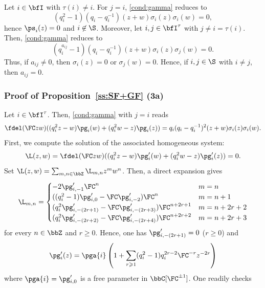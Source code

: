 \documentclass[reqno]{amsart}
\numberwithin{equation}{section}
\begin{document}
Let $i\in\bfI$ with $\tau(i)\neq i$. For $j=i$, \eqref{cond:gamma} reduces to 
\[
(q_i^{2}-1)(q_i-q_i^{-1})(z+w)\sigma_i(z)\sigma_i(w)=0,
\]
hence $\ps_i(z)=0$ and $i\not\in\S$. Moreover, let $i,j\in\bfI^\tau$ with $j\neq i=\tau(i)$. Then,
\eqref{cond:gamma} reduces to 
\[
(q_i^{a_{ij}}-1)(q_i-q_i^{-1})(z+w)\sigma_i(z)\sigma_j(w)=0.
\]
Thus, if $a_{ij}\neq 0$, then $\sigma_i(z)=0$ or $\sigma_j(w)=0$. Hence, if $i,j\in\S$ with $i\neq j$, then $a_{ij}=0$.

\subsubsection{Proof of Proposition~\ref{ss:SF+GF} (3a)}\label{sss:pf-parameter-3a}
Let $i\in\bfI^\tau$. Then, \eqref{cond:gamma} with $j=i$ reads
\begin{equation}
	\begin{aligned}
		\fdel(\FC zw)
		((q_i^{2}z-w)\pg_{i}(w)
		+(q_i^{2}w-z)\pg_i(z))=q_i(q_i-q_i^{-1})^2(z+w)\sigma_i(z)\sigma_i(w).
	\end{aligned}
\end{equation}
First, we compute the solution of the associated homogeneous system:
\begin{equation}
	\begin{aligned}
		\L(z,w)=\fdel(\FC zw)((q_i^{2}z-w)\pg'_{i}(w)+(q_i^{2}w-z)\pg'_i(z))=0.
	\end{aligned}
\end{equation}
Set $\L(z,w)=\sum_{m,n\in\bbZ}\L_{m,n}z^mw^n$. Then, a direct expansion gives
\begin{equation}
\L_{m,n}=
\begin{cases}
-2\pg'_{i,-1}\FC^n & m=n\\
((q_i^2-1)\pg'_{i,0}-\FC \pg'_{i,-2})\FC^n & m=n+1\\
(q_i^2\pg'_{i,-(2r+1)}-\FC \pg'_{i,-(2r+3)})\FC^{n+2r+1} & m=n+2r+2\\
(q_i^2\pg'_{i,-(2r+2)}-\FC \pg'_{i,-(2r+4)})\FC^{n+2r+2} & m=n+2r+3
\end{cases}	
\end{equation}
for every $n\in\bbZ$ and $r\geqslant 0$. Hence, one has $\pg'_{i,-(2r+1)}=0$ ($r\geqslant 0$) and 
\begin{equation}
\begin{aligned}
\pg'_{i}(z)
=\pga{i}\left(1+\sum_{r\geqslant 1}(q_i^2-1)q_i^{2r-2}\FC^{-r}z^{-2r}\right)
\end{aligned}
\end{equation}
where $\pga{i}=\pg'_{i,0}$ is a free parameter in $\bbC[\FC^{\pm1}]$. One readily checks
\end{document}
